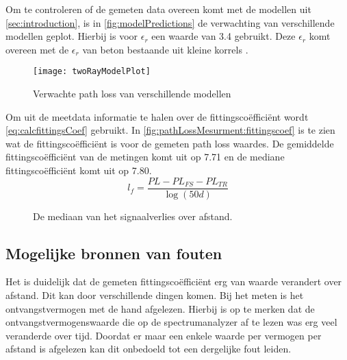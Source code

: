 Om te controleren of de gemeten data overeen komt met de modellen uit \autoref{sec:introduction}, is in \autoref{fig:modelPredictions} de verwachting van verschillende modellen geplot. Hierbij is voor $\epsilon_r$ een waarde van 3.4 gebruikt. Deze $\epsilon_r$ komt overeen met de $\epsilon_r$ van beton bestaande uit kleine korrels \cite{zhekov2020dielectric}.
\begin{figure}[ht]
    \centering
    \texttt{[image: twoRayModelPlot]}
    \caption{Verwachte path loss van verschillende modellen}
    \label{fig:modelPredictions}
\end{figure}

Om uit de meetdata informatie te halen over de fittingscoëfficiënt wordt \autoref{eq:calcfittingsCoef} gebruikt. In \autoref{fig:pathLossMesurment:fittingscoef} is te zien wat de fittingscoëfficiënt is voor de gemeten path loss waardes. De gemiddelde fittingscoëfficiënt van de metingen komt uit op 7.71 en de mediane fittingscoëfficiënt komt uit op 7.80.
\begin{equation} \label{eq:calcfittingsCoef}
    l_f=\frac{PL-PL_{FS}-PL_{TR}}{\log\left(50d\right)}
\end{equation}
\begin{figure}[ht]
    \centering
{}
\caption{De mediaan van het signaalverlies over afstand.}
\label{fig:pathLossMesurment:fittingscoef}
\end{figure}

\subsection{Mogelijke bronnen van fouten}
Het is duidelijk dat de gemeten fittingscoëfficiënt erg van waarde verandert over afstand. Dit kan door verschillende dingen komen. Bij het meten is het ontvangstvermogen met de hand afgelezen. Hierbij is op te merken dat de ontvangstvermogenswaarde die op de spectrumanalyzer af te lezen was erg veel veranderde over tijd. Doordat er maar een enkele waarde per vermogen per afstand is afgelezen kan dit onbedoeld tot een dergelijke fout leiden.

